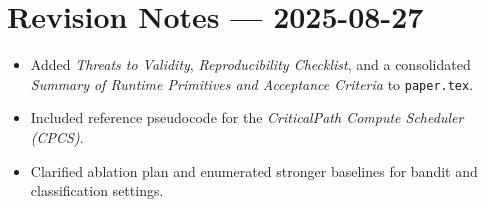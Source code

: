 \hypertarget{revision-notes-2025-08-27}{%
\section{Revision Notes --- 2025-08-27}}
\begin{itemize}
  \item Added \emph{Threats to Validity}, \emph{Reproducibility Checklist}, and a consolidated \emph{Summary of Runtime Primitives and Acceptance Criteria} to \texttt{paper.tex}.
 
  \item Included reference pseudocode for the \emph{Critical\-Path Compute Scheduler (CPCS)}.
 
  \item Clarified ablation plan and enumerated stronger baselines for bandit and classification settings.
\end{itemize}


